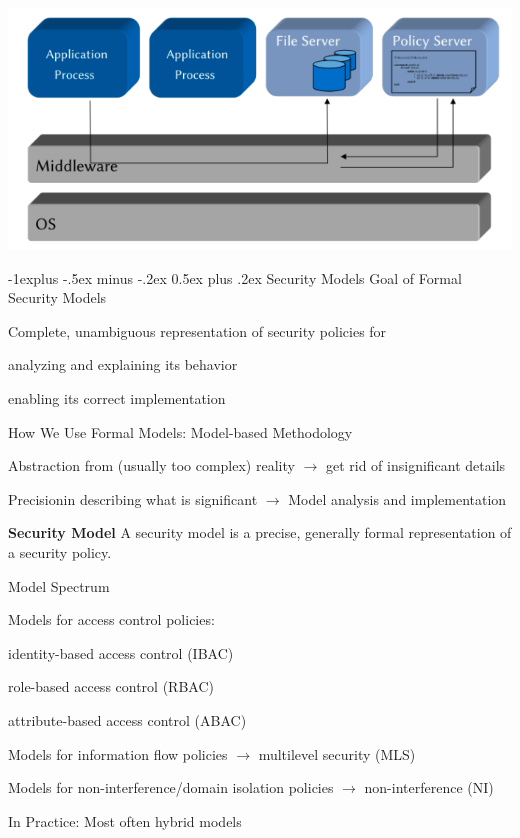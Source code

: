 \documentclass[a4paper]{article}
\makeatletter
\renewcommand{\note}[2]{\begin{noteBox} \textbf{#1} #2 \end{noteBox}}
\renewcommand{\subsection}{\@startsection{subsection}{2}{0mm}%
                {-1explus -.5ex minus -.2ex}%
                {0.5ex plus .2ex}%
                {\normalfont\normalsize\bfseries}}
\makeatother
\begin{document}
\begin{multicols}{3}
    \includegraphics[width=.5\linewidth]{Assets/Systemsicherheit-application-embedded-policy.png}

    \subsection{Security Models}
    Goal of Formal Security Models
    \begin{itemize*}
        \item Complete, unambiguous representation of security policies for
        \item analyzing and explaining its behavior
        \item enabling its correct implementation
    \end{itemize*}

    How We Use Formal Models: Model-based Methodology
    \begin{itemize*}
        \item Abstraction from (usually too complex) reality $\rightarrow$ get rid of insignificant details
        \item Precisionin describing what is significant $\rightarrow$ Model analysis and implementation
    \end{itemize*}

    \note{Security Model}{A security model is a precise, generally formal representation of a security policy.}

    Model Spectrum
    \begin{itemize*}
        \item Models for access control policies:
        \begin{itemize*}
            \item identity-based access control (IBAC)
            \item role-based access control (RBAC)
            \item attribute-based access control (ABAC)
        \end{itemize*}
        \item Models for information flow policies $\rightarrow$ multilevel security (MLS)
        \item Models for non-interference/domain isolation policies $\rightarrow$ non-interference (NI)
        \item In Practice: Most often hybrid models
    \end{itemize*}


\end{multicols}
\end{document}
